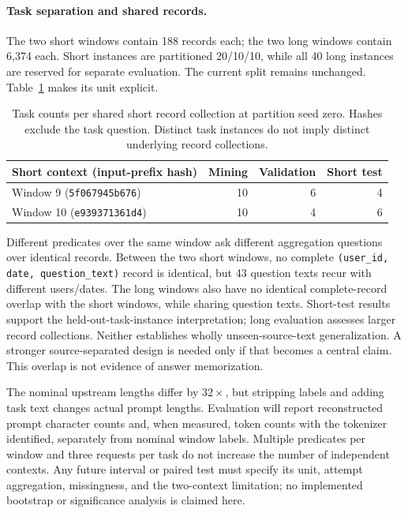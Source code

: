 \paragraph{Task separation and shared records.}
The two short windows contain 188 records each; the two long windows contain
6,374 each. Short instances are partitioned 20/10/10, while all 40 long
instances are reserved for separate evaluation. The current split remains
unchanged. Table~\ref{tab:context-overlap} makes its unit explicit.

\begin{table}[htbp]
\centering\small
\begin{tabular}{@{}lrrr@{}}
\toprule
Short context (input-prefix hash) & Mining & Validation & Short test \\
\midrule
Window 9 (\texttt{5f067945b676}) & 10 & 6 & 4 \\
Window 10 (\texttt{e939371361d4}) & 10 & 4 & 6 \\
\bottomrule
\end{tabular}
\caption{Task counts per shared short record collection at partition seed zero.
Hashes exclude the task question. Distinct task instances do not imply distinct
underlying record collections.}
\label{tab:context-overlap}
\end{table}

Different predicates over the same window ask different aggregation questions
over identical records. Between the two short windows, no complete
\texttt{(user\_id, date, question\_text)} record is identical, but 43 question
texts recur with different users/dates. The long windows also have no identical
complete-record overlap with the short windows, while sharing question texts.
Short-test results support the held-out-task-instance interpretation; long
evaluation assesses larger record collections. Neither establishes wholly
unseen-source-text generalization. A stronger source-separated design is needed
only if that becomes a central claim. This overlap is not evidence of answer
memorization.

The nominal upstream lengths differ by $32\times$, but stripping labels and
adding task text changes actual prompt lengths. Evaluation will report
reconstructed prompt character counts and, when measured, token counts with
the tokenizer identified, separately from nominal window labels. Multiple
predicates per window and three requests per task do not increase the number of
independent contexts. Any future interval or paired test must specify its unit,
attempt aggregation, missingness, and the two-context limitation; no implemented
bootstrap or significance analysis is claimed here.

